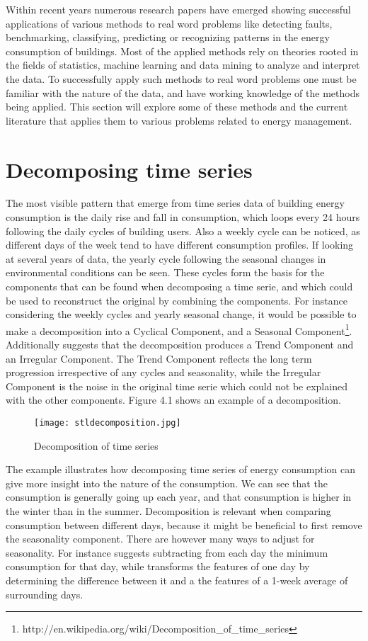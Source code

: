 Within recent years numerous research papers have emerged showing successful applications of various methods to real word problems like detecting faults, benchmarking, classifying, predicting or recognizing patterns in the energy consumption of buildings. Most of the applied methods rely on theories rooted in the fields of statistics, machine learning and data mining to analyze and interpret the data. To successfully apply such methods to real word problems one must be familiar with the nature of the data, and have working knowledge of the methods being applied. This section will explore some of these methods and the current literature that applies them to various problems related to energy management.

\section{Decomposing time series}
The most visible pattern that emerge from time series data of building energy consumption is the daily rise and fall in consumption, which loops every 24 hours following the daily cycles of building users. Also a weekly cycle can be noticed, as different days of the week tend to have different consumption profiles. If looking at several years of data, the yearly cycle following the seasonal changes in environmental conditions can be seen. These cycles form the basis for the components that can be found when decomposing a time serie, and which could be used to reconstruct the original by combining the components. For instance considering the weekly cycles and yearly seasonal change, it would be possible to make a decomposition into a Cyclical Component, and a Seasonal Component\footnote{http://en.wikipedia.org/wiki/Decomposition\_of\_time\_series}. Additionally suggests that the decomposition produces a Trend Component  and an Irregular Component. The Trend Component reflects the long term progression irrespective of any cycles and seasonality, while the Irregular Component is the noise in the original time serie which could not be explained with the other components. Figure 4.1 shows an example of a decomposition.
\begin{figure}
\begin{center}
\texttt{[image: stldecomposition.jpg]}
\end{center}
\caption{Decomposition of time series}
\end{figure}
\newline
\newline
The example illustrates how decomposing time series of energy consumption can give more insight into the nature of the consumption. We can see that the consumption is generally going up each year, and that consumption is higher in the winter than in the summer. Decomposition is relevant when comparing consumption between different days, because it might be beneficial to first remove the seasonality component. There are however many ways to adjust for seasonality. For instance \cite{faultdetec2} suggests subtracting from each day the minimum consumption for that day, while \cite{faultdetec4} transforms the features of one day by determining the difference
between it and a the features of a 1-week average of surrounding days. 

